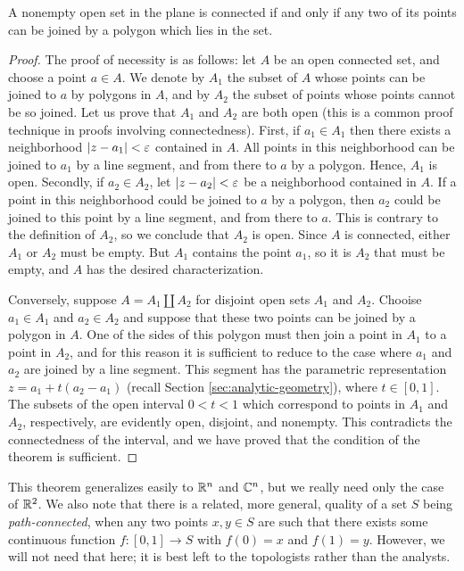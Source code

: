 \begin{theorem}
	A nonempty open set in the plane is connected if and only if any two of its points can be joined by a polygon which lies in the set.
\end{theorem}
\begin{proof}
	The proof of necessity is as follows: let $A$ be an open connected set, and choose a point $a \in A$. We denote by $A_1$ the subset of $A$ whose points can be joined to $a$ by polygons in $A$, and by $A_2$ the subset of points whose points cannot be so joined. Let us prove that $A_1$ and $A_2$ are both open (this is a common proof technique in proofs involving connectedness). First, if $a_1 \in A_1$ then there exists a neighborhood $\lvert z-a_1 \rvert<\varepsilon$ contained in $A$. All points in this neighborhood can be joined to $a_1$ by a line segment, and from there to $a$ by a polygon. Hence, $A_1$ is open. Secondly, if $a_2 \in A_2$, let $\lvert z-a_2 \rvert<\varepsilon$ be a neighborhood contained in $A$. If a point in this neighborhood could be joined to $a$ by a polygon, then $a_2$ could be joined to this point by a line segment, and from there to $a$. This is contrary to the definition of $A_2$, so we conclude that $A_2$ is open. Since $A$ is connected, either $A_1$ or $A_2$ must be empty. But $A_1$ contains the point $a_1$, so it is $A_2$ that must be empty, and $A$ has the desired characterization.
	
	Conversely, suppose $A=A_1 \coprod A_2$ for disjoint open sets $A_1$ and $A_2$. Chooise $a_1 \in A_1$ and $a_2 \in A_2$ and suppose that these two points can be joined by a polygon in $A$. One of the sides of this polygon must then join a point in $A_1$ to a point in $A_2$, and for this reason it is sufficient to reduce to the case where $a_1$ and $a_2$ are joined by a line segment. This segment has the parametric representation $z=a_1+t(a_2-a_1)$ (recall Section \ref{sec:analytic-geometry}), where $t \in [0,1]$. The subsets of the open interval $0<t<1$ which correspond to points in $A_1$ and $A_2$, respectively, are evidently open, disjoint, and nonempty. This contradicts the connectedness of the interval, and we have proved that the condition of the theorem is sufficient.
\end{proof}

This theorem generalizes easily to $\mathbb R^n$ and $\mathbb C^n$, but we really need only the case of $\mathbb R^2$. We also note that there is a related, more general, quality of a set $S$ being \emph{path-connected}, when any two points $x,y \in S$ are such that there exists some continuous function $f \colon [0,1] \rightarrow S$ with $f(0)=x$ and $f(1)=y$. However, we will not need that here; it is best left to the topologists rather than the analysts.

